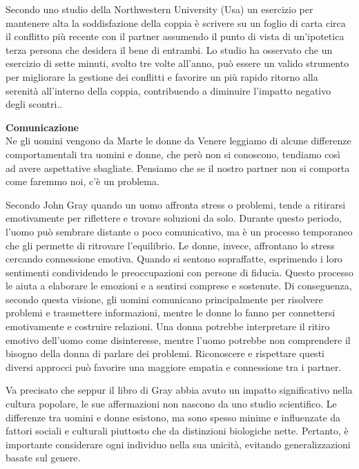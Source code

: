 \documentclass[12pt]{book} %
\begin{document}
\begin{mdframed}[linewidth=1pt]
Secondo uno studio della Northwestern University (Usa) un esercizio per mantenere alta la soddisfazione della coppia è
scrivere su un foglio di carta circa il conflitto più recente con il partner assumendo il punto di vista di
un'ipotetica terza persona che desidera il bene di entrambi. Lo studio ha osservato che un esercizio di sette minuti, svolto tre volte all'anno, può essere un valido strumento per migliorare la gestione dei conflitti e favorire un più rapido ritorno alla serenità all'interno della coppia, contribuendo a diminuire l'impatto negativo degli scontri..
\end{mdframed}

\noindent \textbf{\large Comunicazione} \\
Ne gli uomini vengono da Marte le donne da
Venere leggiamo di alcune
differenze comportamentali tra uomini e donne, che però non si conoscono, tendiamo così ad avere aspettative sbagliate.
Pensiamo che se il nostro partner non si comporta come faremmo noi, c'è un problema. 

Secondo John Gray quando un uomo affronta stress o problemi, tende a ritirarsi emotivamente per riflettere e trovare soluzioni da solo. Durante questo periodo, l'uomo può sembrare distante o poco comunicativo, ma è un processo temporaneo che gli permette di ritrovare l'equilibrio. Le donne, invece, affrontano lo stress cercando connessione emotiva. Quando si sentono sopraffatte, esprimendo i loro sentimenti condividendo le preoccupazioni con persone di fiducia. Questo processo le aiuta a elaborare le emozioni e a sentirsi comprese e sostenute.
Di conseguenza, secondo questa visione, gli uomini comunicano principalmente per risolvere problemi e trasmettere informazioni, mentre le donne lo fanno per connettersi emotivamente e costruire relazioni.
Una donna potrebbe interpretare il ritiro emotivo dell'uomo come disinteresse, mentre l'uomo potrebbe non comprendere il bisogno della donna di parlare dei problemi. Riconoscere e rispettare questi diversi approcci può favorire una maggiore empatia e connessione tra i partner.

Va precisato che seppur il libro di Gray abbia avuto un impatto significativo nella cultura popolare, le sue affermazioni non nascono da uno studio scientifico. Le differenze tra uomini e donne esistono, ma sono spesso minime e influenzate da fattori sociali e culturali piuttosto che da distinzioni biologiche nette. Pertanto, è importante considerare ogni individuo nella sua unicità, evitando generalizzazioni basate sul genere.
\end{document}
